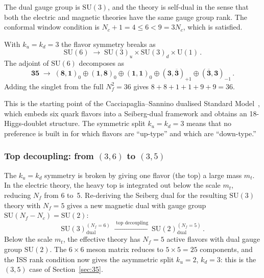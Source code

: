\documentclass[11pt,a4paper]{article}
\newcommand{\Nf}{N_{\!f}}
\newcommand{\Nc}{N_{\!c}}
\newcommand{\rep}[1]{\mathbf{#1}}
\newcommand{\conjrep}[1]{\overline{\mathbf{#1}}}
\begin{document}
The dual gauge group is $\mathrm{SU}(3)$, and the theory is
self-dual in the sense that both the electric and magnetic theories
have the same gauge group rank.
The conformal window condition is $\Nc + 1 = 4 \le 6 < 9 = 3\Nc$,
which is satisfied.

With $k_u = k_d = 3$ the flavor symmetry breaks as
\begin{equation}
  \mathrm{SU}(6) \;\to\;
  \mathrm{SU}(3)_u \times \mathrm{SU}(3)_d \times \mathrm{U}(1)\,.
\end{equation}
The adjoint of $\mathrm{SU}(6)$ decomposes as
\begin{equation}
  \rep{35} \;\to\;
  (\rep{8},\rep{1})_0 \oplus (\rep{1},\rep{8})_0
  \oplus (\rep{1},\rep{1})_0
  \oplus (\rep{3},\conjrep{3})_{+1}
  \oplus (\conjrep{3},\rep{3})_{-1}\,.
  \label{eq:adj-36}
\end{equation}
Adding the singlet from the full $\Nf^2 = 36$ gives
$8 + 8 + 1 + 1 + 9 + 9 = 36$.

This is the starting point of the Cacciapaglia--Sannino dualised
Standard Model~\cite{CacciapagliaSannino2024}, which embeds six
quark flavors into a Seiberg-dual framework and obtains an
18-Higgs-doublet structure.
The symmetric split $k_u = k_d = 3$ means that no preference is
built in for which flavors are ``up-type'' and which are
``down-type.''

\subsubsection*{Top decoupling: from $(3,6)$ to $(3,5)$}

The $k_u = k_d$ symmetry is broken by giving one flavor (the top)
a large mass $m_t$.  In the electric theory, the heavy top
is integrated out below the scale $m_t$, reducing $\Nf$ from 6
to~5.  Re-deriving the Seiberg dual for the resulting
$\mathrm{SU}(3)$ theory with $\Nf = 5$ gives a new magnetic dual
with gauge group $\mathrm{SU}(\Nf - \Nc) = \mathrm{SU}(2)$:
\begin{equation}
  \mathrm{SU}(3)_{\text{dual}}^{(\Nf=6)}
  \;\xrightarrow{\;\text{top decoupling}\;}
  \mathrm{SU}(2)_{\text{dual}}^{(\Nf=5)}\,.
  \label{eq:decoupling-36}
\end{equation}
Below the scale $m_t$, the effective theory has $\Nf = 5$ active
flavors with dual gauge group $\mathrm{SU}(2)$.  The $6\times 6$
meson matrix reduces to $5\times 5 = 25$ components, and the ISS
rank condition now gives the asymmetric split $k_u = 2$,
$k_d = 3$: this is the $(3,5)$ case of
Section~\ref{sec:35}.
\end{document}
